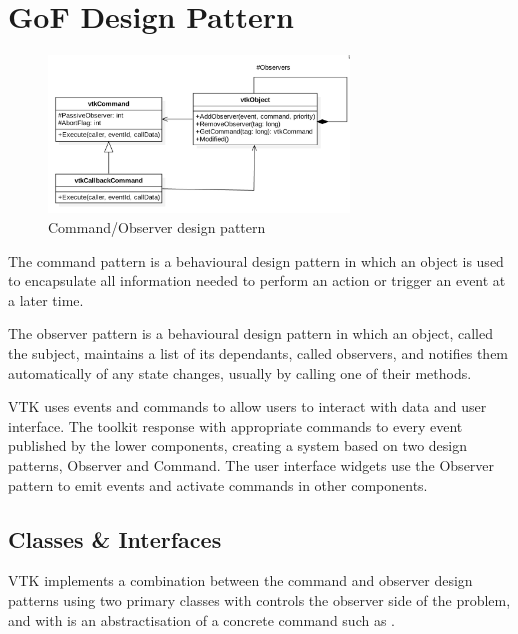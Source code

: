 
\section{GoF Design Pattern}

\begin{figure}[h]
    \centering
    \includegraphics[width=8cm]{diagrams/design_pattern.png}
    \caption{Command/Observer design pattern}
    \label{fig::design::pattern}
\end{figure}

\begin{definition}
The command pattern is a behavioural design pattern in which an object is used to encapsulate all information needed to perform an action or trigger an event at a later time.
\end{definition}

\begin{definition}
The observer pattern is a behavioural design pattern in which an object, called the subject, maintains a list of its dependants, called observers, and notifies them automatically of any state changes, usually by calling one of their methods.
\end{definition}

VTK uses events and commands to allow users to interact with data and user interface. The toolkit response with appropriate commands to every event published by the lower components, creating a system based on two design patterns, Observer and Command. The user interface widgets use the Observer pattern to emit events and activate commands in other components.  

\subsection{Classes \& Interfaces}

VTK implements a combination between the command and observer design patterns using two primary classes  with controls the observer side of the problem, and  with is an abstractisation of a concrete command such as  \cite{git}.

